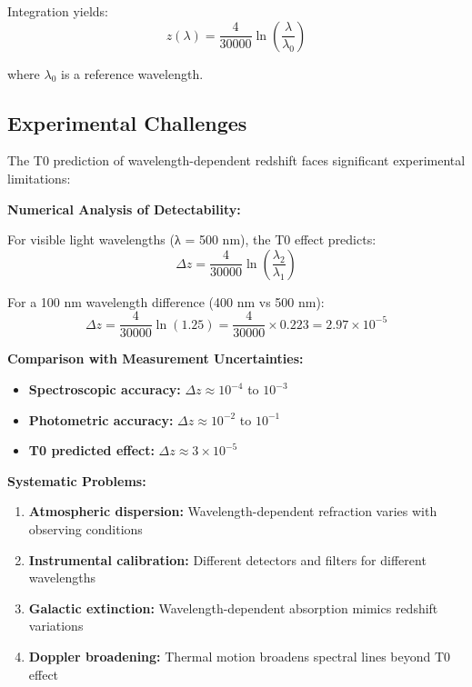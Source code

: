 \documentclass[12pt,a4paper]{report}
\begin{document}
	Integration yields:
	\begin{equation}
		z(\lambda) = \frac{4}{30000} \ln\left(\frac{\lambda}{\lambda_0}\right)
	\end{equation}
	
	where $\lambda_0$ is a reference wavelength.
	
\subsection{Experimental Challenges}\label{subsec:experimental_challenges_redshift}

The T0 prediction of wavelength-dependent redshift faces significant experimental limitations:

\textbf{Numerical Analysis of Detectability:}

For visible light wavelengths (λ = 500 nm), the T0 effect predicts:
\begin{equation}
	\Delta z = \frac{4}{30000} \ln\left(\frac{\lambda_2}{\lambda_1}\right)
\end{equation}

For a 100 nm wavelength difference (400 nm vs 500 nm):
\begin{equation}
	\Delta z = \frac{4}{30000} \ln(1.25) = \frac{4}{30000} \times 0.223 = 2.97 \times 10^{-5}
\end{equation}

\textbf{Comparison with Measurement Uncertainties:}
\begin{itemize}
	\item \textbf{Spectroscopic accuracy:} $\Delta z \approx 10^{-4}$ to $10^{-3}$
	\item \textbf{Photometric accuracy:} $\Delta z \approx 10^{-2}$ to $10^{-1}$
	\item \textbf{T0 predicted effect:} $\Delta z \approx 3 \times 10^{-5}$
\end{itemize}

\textbf{Systematic Problems:}
\begin{enumerate}
	\item \textbf{Atmospheric dispersion:} Wavelength-dependent refraction varies with observing conditions
	\item \textbf{Instrumental calibration:} Different detectors and filters for different wavelengths
	\item \textbf{Galactic extinction:} Wavelength-dependent absorption mimics redshift variations
	\item \textbf{Doppler broadening:} Thermal motion broadens spectral lines beyond T0 effect
\end{enumerate}
\end{document}
